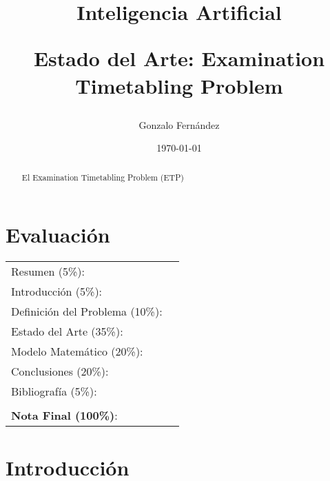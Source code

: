 \documentclass[letter, 10pt]{article}
\begin{document}
\title{Inteligencia Artificial \\ \begin{Large}Estado del Arte: Examination Timetabling Problem\end{Large}}
\author{Gonzalo Fernández}
\date{\today}
\maketitle


\section*{Evaluaci\'on}

\begin{tabular}{ll}
Resumen (5\%): & \underline{\hspace{2cm}} \\
Introducci\'on (5\%):  & \underline{\hspace{2cm}} \\
Definici\'on del Problema (10\%):  & \underline{\hspace{2cm}} \\
Estado del Arte (35\%):  & \underline{\hspace{2cm}} \\
Modelo Matem\'atico (20\%): &  \underline{\hspace{2cm}}\\
Conclusiones (20\%): &  \underline{\hspace{2cm}}\\
Bibliograf\'ia (5\%): & \underline{\hspace{2cm}}\\
 &  \\
\textbf{Nota Final (100\%)}:   & \underline{\hspace{2cm}}
\end{tabular}
\vspace{2cm}


\begin{abstract}
El Examination Timetabling Problem (ETP)
\end{abstract}

\section{Introducci\'on}
\end{document}
